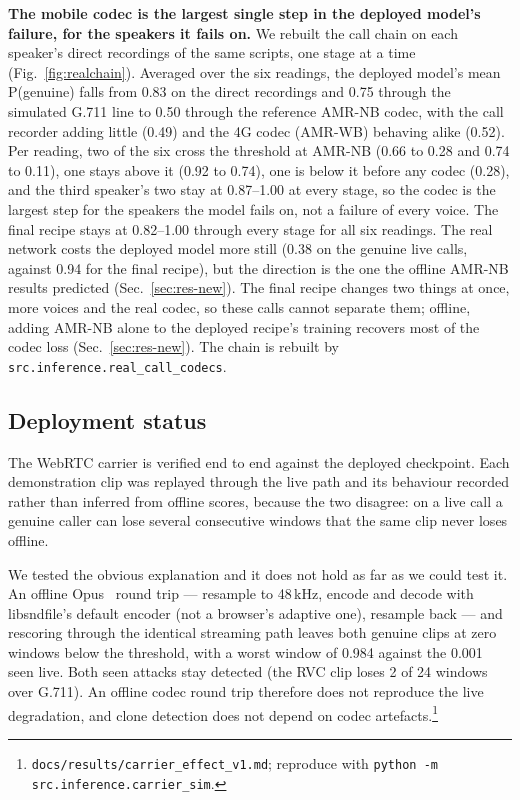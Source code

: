\textbf{The mobile codec is the largest single step in the deployed model's failure, for the
speakers it fails on.} We rebuilt the call chain on each speaker's direct recordings of the same
scripts, one stage at a time (Fig.~\ref{fig:realchain}). Averaged over the six readings, the
deployed model's mean P(genuine) falls from 0.83 on the direct recordings and 0.75 through the
simulated G.711 line to 0.50 through the reference AMR-NB codec, with the call recorder adding
little (0.49) and the 4G codec (AMR-WB) behaving alike (0.52). Per reading, two of the six cross
the threshold at AMR-NB (0.66 to 0.28 and 0.74 to 0.11), one stays above it (0.92 to 0.74),
one is below it before any codec (0.28), and the third speaker's two stay at 0.87--1.00 at
every stage, so the codec is the largest step for the speakers the model fails on, not a failure
of every voice. The final recipe stays at 0.82--1.00 through every stage for all six readings.
The real network costs the deployed model more still (0.38 on the genuine live calls, against
0.94 for the final recipe), but the direction is the one the offline AMR-NB results predicted
(Sec.~\ref{sec:res-new}). The final recipe changes two things at once, more voices and the real
codec, so these calls cannot separate them; offline, adding AMR-NB alone to the deployed
recipe's training recovers most of the codec loss (Sec.~\ref{sec:res-new}). The chain is
rebuilt by \texttt{src.inference.real\_call\_codecs}.

\subsection{Deployment status}

The WebRTC carrier is verified end to end against the deployed checkpoint. Each
demonstration clip was replayed through the live path and its behaviour recorded
rather than inferred from offline scores, because the two disagree: on a live call a
genuine caller can lose several consecutive windows that the same clip never loses
offline.

We tested the obvious explanation and it does not hold as far as we could test it.
An offline Opus~\cite{valin2012opus} round trip --- resample to 48\,kHz, encode and decode
with libsndfile's default encoder (not a browser's adaptive one), resample back --- and
rescoring through the identical streaming path leaves both genuine clips at zero windows
below the threshold, with a worst window of 0.984 against the 0.001 seen live. Both seen
attacks stay detected (the RVC clip loses 2 of 24 windows over G.711). An offline codec
round trip therefore does not reproduce the live degradation, and clone detection does
not depend on codec artefacts.\footnote{%
\texttt{docs/results/carrier\_effect\_v1.md}; reproduce with
\texttt{python -m src.inference.carrier\_sim}.}

